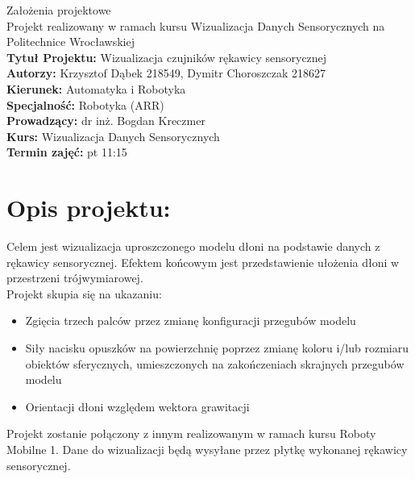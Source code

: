 \documentclass[12pt,a4paper]{article}
\begin{document}
\LARGE\centering Założenia projektowe\\
\large\centering Projekt realizowany w ramach kursu Wizualizacja Danych Sensorycznych na Politechnice Wrocławskiej\\
\vspace{5 mm}
\normalsize\flushleft\textbf{Tytuł Projektu:} Wizualizacja czujników rękawicy sensorycznej\\
\textbf{Autorzy:} Krzysztof Dąbek 218549, Dymitr Choroszczak 218627\\
\textbf{Kierunek:} Automatyka i Robotyka\\
\textbf{Specjalność:} Robotyka (ARR)\\
\textbf{Prowadzący:} dr inż. Bogdan Kreczmer\\
\textbf{Kurs:} Wizualizacja Danych Sensorycznych\\
\textbf{Termin zajęć:} pt 11:15\\
\vspace{5 mm}

\section{Opis projektu:} \normalsize
Celem jest wizualizacja uproszczonego modelu dłoni na podstawie danych z rękawicy sensorycznej. 
Efektem końcowym jest przedstawienie ułożenia dłoni w przestrzeni trójwymiarowej. \\
\vspace{1cm}
Projekt skupia się na ukazaniu:
\begin{itemize}
\item Zgięcia trzech palców przez zmianę konfiguracji przegubów modelu
\item Siły nacisku opuszków na powierzchnię poprzez zmianę koloru i/lub rozmiaru obiektów sferycznych, umieszczonych na zakończeniach skrajnych przegubów modelu
\item Orientacji dłoni względem wektora grawitacji
\end{itemize} 
Projekt zostanie połączony z innym realizowanym w ramach kursu Roboty Mobilne 1. Dane do wizualizacji będą wysyłane przez płytkę wykonanej rękawicy sensorycznej.
\end{document}
